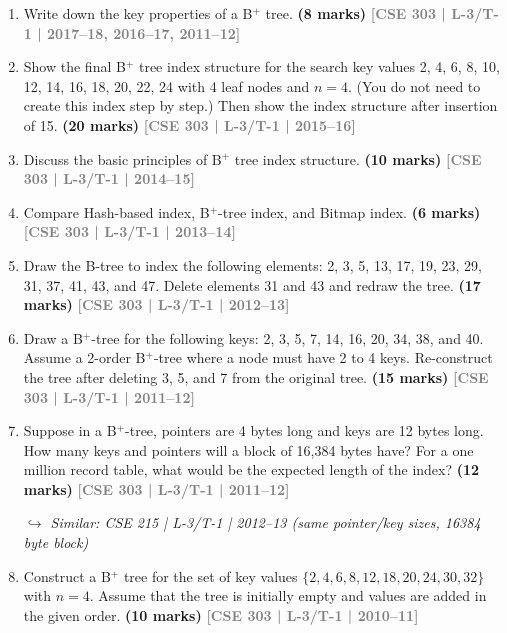 \documentclass[12pt]{article}
\newcommand{\yr}[1]{\hfill\textcolor{gray}{\small\textbf{[#1]}}}
\newcommand{\mk}[1]{\textcolor{orange!70!black}{\small\textbf{(#1 marks)}}}
\newcommand{\variant}[1]{\par\vspace{1pt}\textcolor{blue!50!black}%
  {\footnotesize\textit{$\hookrightarrow$ Similar: #1}}}
\begin{document}
\begin{enumerate}
\begin{center}
\end{center}

\mk{8} \yr{CSE 303 | L-3/T-1 | 2016--17}


\item Write down the key properties of a B$^+$ tree.
\mk{8} \yr{CSE 303 | L-3/T-1 | 2017--18, 2016--17, 2011--12}


\item Show the final B$^+$ tree index structure for the search key values 2, 4, 6, 8, 10, 12, 14, 16, 18, 20, 22, 24 with 4 leaf nodes and $n = 4$. (You do not need to create this index step by step.) Then show the index structure after insertion of 15.
\mk{20} \yr{CSE 303 | L-3/T-1 | 2015--16}


\item Discuss the basic principles of B$^+$ tree index structure.
\mk{10} \yr{CSE 303 | L-3/T-1 | 2014--15}


\item Compare Hash-based index, B$^+$-tree index, and Bitmap index.
\mk{6} \yr{CSE 303 | L-3/T-1 | 2013--14}


\item Draw the B-tree to index the following elements: 2, 3, 5, 13, 17, 19, 23, 29, 31, 37, 41, 43, and 47. Delete elements 31 and 43 and redraw the tree.
\mk{17} \yr{CSE 303 | L-3/T-1 | 2012--13}


\item Draw a B$^+$-tree for the following keys: 2, 3, 5, 7, 14, 16, 20, 34, 38, and 40. Assume a 2-order B$^+$-tree where a node must have 2 to 4 keys. Re-construct the tree after deleting 3, 5, and 7 from the original tree.
\mk{15} \yr{CSE 303 | L-3/T-1 | 2011--12}


\item Suppose in a B$^+$-tree, pointers are 4 bytes long and keys are 12 bytes long. How many keys and pointers will a block of 16,384 bytes have? For a one million record table, what would be the expected length of the index?
\mk{12} \yr{CSE 303 | L-3/T-1 | 2011--12}
\variant{CSE 215 | L-3/T-1 | 2012--13 (same pointer/key sizes, 16384 byte block)}


\item Construct a B$^+$ tree for the set of key values $\{2, 4, 6, 8, 12, 18, 20, 24, 30, 32\}$ with $n = 4$. Assume that the tree is initially empty and values are added in the given order.
\mk{10} \yr{CSE 303 | L-3/T-1 | 2010--11}


\end{enumerate}
\end{document}
